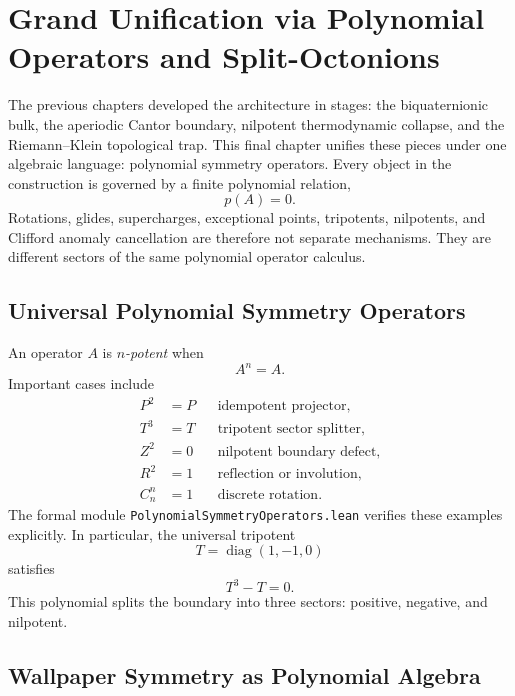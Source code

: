 \chapter{Grand Unification via Polynomial Operators and Split-Octonions}

The previous chapters developed the architecture in stages: the biquaternionic bulk, the aperiodic Cantor boundary, nilpotent thermodynamic collapse, and the Riemann--Klein topological trap.  This final chapter unifies these pieces under one algebraic language: polynomial symmetry operators.  Every object in the construction is governed by a finite polynomial relation,
\begin{equation}
    p(A)=0.
\end{equation}
Rotations, glides, supercharges, exceptional points, tripotents, nilpotents, and Clifford anomaly cancellation are therefore not separate mechanisms.  They are different sectors of the same polynomial operator calculus.

\section{Universal Polynomial Symmetry Operators}

An operator $A$ is \emph{$n$-potent} when
\begin{equation}
    A^n=A.
\end{equation}
Important cases include
\begin{align}
    P^2&=P &&\text{idempotent projector},\\
    T^3&=T &&\text{tripotent sector splitter},\\
    Z^2&=0 &&\text{nilpotent boundary defect},\\
    R^2&=1 &&\text{reflection or involution},\\
    C_n^n&=1 &&\text{discrete rotation}.
\end{align}
The formal module \texttt{PolynomialSymmetryOperators.lean} verifies these examples explicitly.  In particular, the universal tripotent
\begin{equation}
    T=\operatorname{diag}(1,-1,0)
\end{equation}
satisfies
\begin{equation}
    T^3-T=0.
\end{equation}
This polynomial splits the boundary into three sectors: positive, negative, and nilpotent.

\section{Wallpaper Symmetry as Polynomial Algebra}

